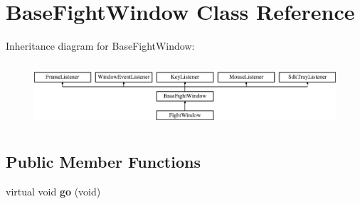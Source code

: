 \hypertarget{class_base_fight_window}{}\section{Base\+Fight\+Window Class Reference}
\label{class_base_fight_window}
Inheritance diagram for Base\+Fight\+Window\+:\begin{figure}[H]
\begin{center}
\leavevmode
\includegraphics[height=2.382979cm]{class_base_fight_window}
\end{center}
\end{figure}
\subsection*{Public Member Functions}
\begin{DoxyCompactItemize}
\item 
virtual void {\bfseries go} (void)\hypertarget{class_base_fight_window_afa9404f1cc512929291ebf14de14073a}{}\label{class_base_fight_window_afa9404f1cc512929291ebf14de14073a}

\end{DoxyCompactItemize}
